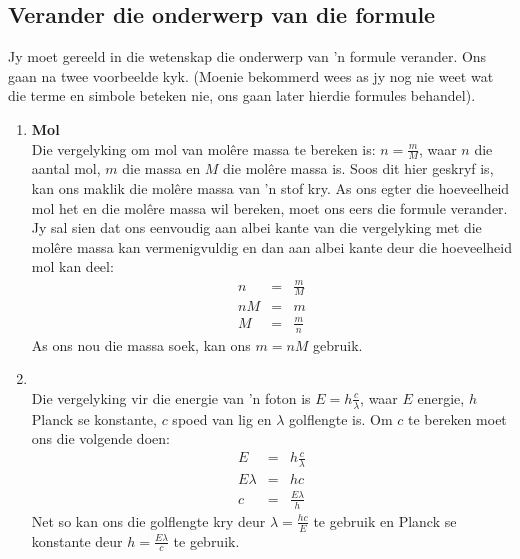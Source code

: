 \subsection*{Verander die onderwerp van die formule}
Jy moet gereeld in die wetenskap die onderwerp van  'n formule verander. Ons gaan na twee voorbeelde kyk. (Moenie bekommerd wees as jy nog nie weet wat die terme en simbole beteken nie, ons gaan later hierdie formules behandel).
\begin{enumerate}[label=\textbf{\arabic*}.]
 \item \textbf{Mol}\\
Die vergelyking om mol van molêre massa te bereken is: $n = \frac{m}{M}$, waar $n$ die aantal mol, $m$ die massa en $M$ die molêre massa is. Soos dit hier geskryf is, kan ons maklik die molêre massa van  'n stof kry. As ons egter die hoeveelheid mol het en die molêre massa wil bereken, moet ons eers die formule verander. Jy sal sien dat ons eenvoudig aan albei kante van die vergelyking met die molêre massa kan vermenigvuldig en dan aan albei kante deur die hoeveelheid mol kan deel:
\begin{eqnarray*}
 n & = & \frac{m}{M} \\
nM & = & m \\
M & = & \frac{m}{n}
\end{eqnarray*}
As ons nou die massa soek, kan ons $m = nM$ gebruik.
\item {}\\
Die vergelyking vir die energie van  'n foton is $E = h\frac{c}{\lambda}$, waar $E$ energie, $h$ Planck se konstante, $c$ spoed van lig en $\lambda$ golflengte is. Om $c$ te bereken moet ons die volgende doen:
\begin{eqnarray*}
 E & = & h\frac{c}{\lambda} \\
E \lambda & = & hc \\
c & = & \frac{E \lambda}{h}
\end{eqnarray*}  
Net so kan ons die golflengte kry deur $\lambda = \frac{hc}{E}$ te gebruik en Planck se konstante deur $h =  \frac{E \lambda}{c}$ te gebruik.
\end{enumerate}
